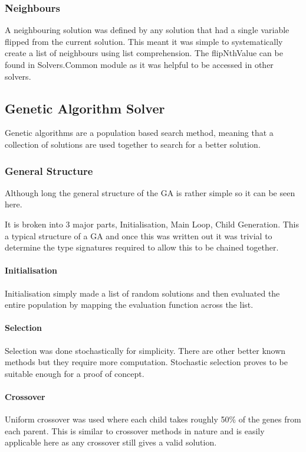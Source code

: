 \documentclass[a4paper]{article}
\begin{document}
\subsubsection{Neighbours}
A neighbouring solution was defined by any solution that had a single variable flipped from the current solution.
This meant it was simple to systematically create a list of neighbours using list comprehension.
The flipNthValue can be found in Solvers.Common module as it was helpful to be accessed in other solvers.


\subsection{Genetic Algorithm Solver}
Genetic algorithms are a population based search method, meaning that a collection of solutions are used together to search for a better solution.

\subsubsection{General Structure}
Although long the general structure of the GA is rather simple so it can be seen here.

It is broken into 3 major parts, Initialisation, Main Loop, Child Generation.
This a typical structure of a GA and once this was written out it was trivial to determine the type signatures required to allow this to be chained together.

\paragraph{Initialisation}\vspace*{-4mm}
Initialisation simply made a list of random solutions and then evaluated the entire population by mapping the evaluation function across the list.
\paragraph{Selection}\vspace*{-4mm}
Selection was done stochastically for simplicity.
There are other better known methods but they require more computation.
Stochastic selection proves to be suitable enough for a proof of concept.
\paragraph{Crossover}\vspace*{-4mm}
Uniform crossover was used where each child takes roughly 50\% of the genes from each parent.
This is similar to crossover methods in nature and is easily applicable here as any crossover still gives a valid solution.
\end{document}
